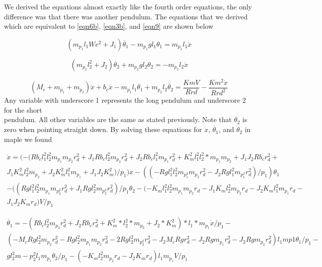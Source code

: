 \documentclass{article}
\begin{document}
We derived the equations almost exactly like the fourth order equations, the only difference was that there was another pendulum. The equations that we derived which are equivalent to \ref{eqn6b}, \ref{eqn3b}, and \ref{eqn9} are shown below

\begin{equation} 
\label{eqn6th1}
(m_p_1 l_1We^2+J_1) \ddot{\theta_1}-m_p_1 g l_1 \theta_1 = m_p_1 l_1 \ddot{x}
\end{equation}

\begin{equation} 
\label{eqn6th2}
(m_p_2 l_2^2+J_2) \ddot{\theta_2}+m_p_2 g l_2 \theta_2 = -m_p_2 l_2 \ddot{x}
\end{equation}

\begin{equation} 
\label{eqn6th3}
(M_c+m_p_1+m_p_2) \ddot{x}+b_c \dot{x}-m_p_1 l_1 \ddot{\theta_1}+m_p_2 l_2 \ddot{\theta_2} = \frac{Km V}{R r d}-\frac{Km^2 \dot{x}}{R r d^2}
\end{equation}
Any variable with underscore 1 represents the long pendulum and underscore 2 for the short \\ pendulum. All other variables are the same as stated previously. Note that $\theta_2$ is zero when pointing straight down. By solving these equations for $\ddot{x}$, $\ddot{\theta_1}$, and $\ddot{\theta_2}$ in maple we found

\begin{multline*} 
\label{eqn6th4}
\ddot{x} = (-(R b_c l_1^2 l_2^2 m_p_1 m_p_2 r_d^2+J_1 R b_c l_2^2 m_p_2 r_d^2+J_2 R b_c l_1^2 m_p_1 r_d^2+K_m^2 l_1^2 l_2^2*m_p_1 m_p_2+J_1 J_2 R b_c r_d^2+\\J_1 K_m^2 l_2^2 m_p_2+J_2 K_m^2 l_1^2 m_p_1+J_1 J_2 K_m^2)/p_1)\dot{x} -((-R g l_1^2 l_2^2 m_p_1^2 m_p_2 r_d^2-J_2 R g l_1^2 m_p_1^2 r_d^2)/p_1)\theta_1 \\-((R g l_1^2 l_2^2 m_p_1 m_p_2^2 r_d^2+J_1 R g l_2^2 m_p_2^2 r_d^2)/p_1 \theta_2 -(-K_m l_1^2 l_2^2 m_p_1 m_p_2 r_d-J_1 K_m l_2^2 m_p_2 r_d-J_2 K_m l_1^2 m_p_1 r_d-\\J_1 J_2 K_m r_d) V/p_1
\end{multline*}

\begin{multline*} 
\label{eqn6th5}
\ddot{\theta_1} = -(R b_c l_2^2 m_p_2 r_d^2+J_2 R b_c r_d^2+K_m^2*l_2^2*m_p_2+J_2*K_m^2)*l_1*m_p_1\dot{x}/p_1 -\\(-M_c R g l_2^2 m_p_2 r_d^2-R g l_2^2 m_p_1 m_p_2 r_d^2-2 R g l_2^2 m_p_2^2 r_d^2-J_2 M_c R g r_d^2-J_2 R g m_p_1 r_d^2-J_2 R g m_p_2 r_d^2) l_1 mp1\theta_1 /p_1-\\g l_2^2 m-p_2^2 l_1 m_p_1 \theta_2/p_1-(-K_m l_2^2 m_p_2 r_d-J_2 K_m r_d) l_1 m_p_1 V/p_1
\end{multline*}
\end{document}
